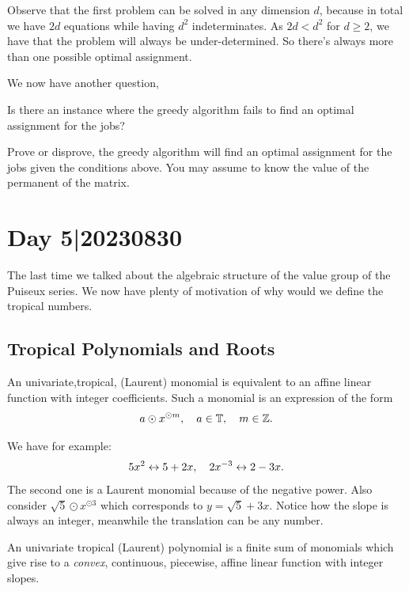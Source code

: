 \documentclass[12pt]{memoir}
\theoremstyle{definition}
\begin{document}
\begin{Rmk}
Observe that the first problem can be solved in any dimension $d$, because in total we have $2d$ equations while having $d^2$ indeterminates. As $2d<d^2$ for $d\geq 2$, we have that the problem will always be under-determined. So there's always more than one possible optimal assignment. 
\end{Rmk}

We now have another question, 
\begin{significant}
    Is there an instance where the greedy algorithm fails to find an optimal assignment for the jobs?
\end{significant}

\begin{Ej}[5]
Prove or disprove, the greedy algorithm will find an optimal assignment for the jobs given the conditions above. You may assume to know the value of the permanent of the matrix.
\end{Ej}
\section{Day 5|20230830}

The last time we talked about the algebraic structure of the value group of the Puiseux series. We now have plenty of motivation of why would we define the tropical numbers. 

\subsection{Tropical Polynomials and Roots}

An univariate,tropical, (Laurent) monomial is equivalent to an affine linear function with integer coefficients. Such a monomial is an expression of the form 
$$a\odot x^{\odot m},\quad a\in\mathbb{T},\quad m\in\mathbb{Z}.$$

\begin{Ex}
    We have for example:
    $$5x^2\leftrightarrow 5+2x,\quad 2x^{-3}\leftrightarrow 2-3x.$$
    The second one is a Laurent monomial because of the negative power. Also consider $\sqrt 5\odot x^{\odot 3}$ which corresponds to $y=\sqrt{5}+3x$. Notice how the slope is always an integer, meanwhile the translation can be any number.
\end{Ex}

An univariate tropical (Laurent) polynomial is a finite sum of monomials which give rise to a \emph{convex}, continuous, piecewise, affine linear function with integer slopes. 
\end{document}

